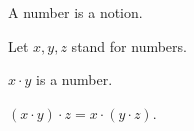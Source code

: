 \begin{forthel}

    \begin{signature}
        A number is a notion.
    \end{signature}

    Let $x, y, z$ stand for numbers.

    \begin{signature}
        $x\cdot y$ is a number.
    \end{signature}

    \begin{axiom}[Associativity]
        $(x\cdot y)\cdot z = x \cdot (y\cdot z)$.
    \end{axiom}
\end{forthel}